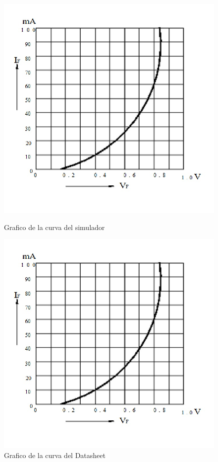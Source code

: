 \documentclass[chaptersright]{informeutn}
\begin{document}
                \begin{figure}[!h]
                    \centering
                    \begin{minipage}[b]{0.4\textwidth}
                        \includegraphics[width=1.1\linewidth]{pictures/Curva_Datash_Ge.jpg}
                        \caption{Grafico de la curva del simulador}
                    \end{minipage}
                    \hfill
                    \begin{minipage}[b]{0.4\textwidth}
                        \includegraphics[width=1.1\linewidth]{pictures/Curva_Datash_Ge.jpg}
                        \caption{Grafico de la curva del Datasheet}
                    \end{minipage}
                \end{figure}
\end{document}
